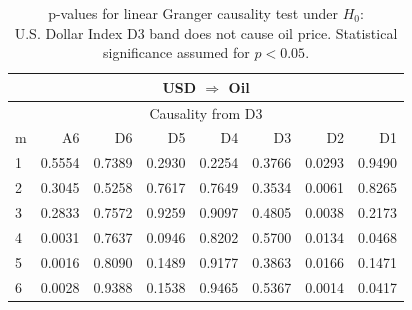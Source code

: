 %
%
\begin{table}[H]
\begin{center}
\begin{tabular}{l|r r r r r r r}
\hline\hline
\multicolumn{8}{c}{USD $\Rightarrow$ Oil}\\
\hline
\multicolumn{8}{c}{Causality from D3}\\
\hline\hline
m & A6 & D6 & D5 & D4 & D3 & D2 & D1 \\
\hline
1 & 0.5554 & 0.7389 & 0.2930 & 0.2254 & 0.3766 & \cellcolor{mygreen}0.0293 & 0.9490 \\
2 & 0.3045 & 0.5258 & 0.7617 & 0.7649 & 0.3534 & \cellcolor{mygrey}0.0061 & 0.8265 \\
3 & 0.2833 & 0.7572 & 0.9259 & 0.9097 & 0.4805 & \cellcolor{mygrey}0.0038 & 0.2173 \\
4 & \cellcolor{mygrey}0.0031 & 0.7637 & 0.0946 & 0.8202 & 0.5700 & \cellcolor{mygrey}0.0134 & \cellcolor{mygreen}0.0468 \\
5 & \cellcolor{mygrey}0.0016 & 0.8090 & 0.1489 & 0.9177 & 0.3863 & \cellcolor{mygrey}0.0166 & 0.1471 \\
6 & \cellcolor{mygrey}0.0028 & 0.9388 & 0.1538 & 0.9465 & 0.5367 & \cellcolor{mygrey}0.0014 & \cellcolor{mygrey}0.0417 \\
\hline\hline
\end{tabular}
\caption{p-values for linear Granger causality test under $H_0$:\\
U.S. Dollar Index D3 band does not cause oil price. Statistical significance assumed for $p<0.05$.}
\end{center}
\end{table}

